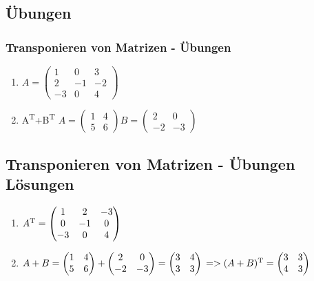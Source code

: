 \subsection{Übungen}
\begin{frame}
\frametitle{Transponieren von Matrizen - Übungen}
\begin{enumerate}
\item $A = \begin{pmatrix}
1 & 0 & 3\\
2 & -1 & -2\\
-3 & 0 & 4
\end{pmatrix}$
\item A\textsuperscript{T}+B\textsuperscript{T}
$A = \begin{pmatrix}
1 & 4 \\
5 & 6
\end{pmatrix}
B = \begin{pmatrix}
2 & 0\\
-2 & -3
\end{pmatrix}$
\end{enumerate}
\end{frame}


\subsection{Transponieren von Matrizen - Übungen Lösungen}
\begin{frame}
\begin{enumerate}
\item $A\textsuperscript{T} = \begin{pmatrix}
1 & 2 & -3\\
0 & -1 & 0\\
-3 & 0 & 4
\end{pmatrix}$
\item $A + B = \begin{pmatrix}
1 & 4\\
5 & 6
\end{pmatrix} + \begin{pmatrix}
2 & 0\\
-2 & -3
\end{pmatrix} = \begin{pmatrix}
3 & 4\\
3 & 3
\end{pmatrix} 
\newline
=> (A+B)\textsuperscript{T} = \begin{pmatrix}
3 & 3\\
4 & 3
\end{pmatrix}$
\end{enumerate}
\end{frame}

